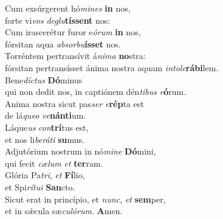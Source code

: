 \evenverse Cum exsúrgerent hó\textit{mi}\textit{nes} \textbf{in} nos,~\*\\
\evenverse forte vi\textit{vos} \textit{de}\textit{glu}\textbf{tís}\textbf{sent} nos:\\
\oddverse Cum irascerétur furor e\textit{ó}\textit{rum} \textbf{in} nos,~\*\\
\oddverse fórsitan aqua \textit{ab}\textit{sor}\textit{bu}\textbf{ís}\textbf{set} nos.\\
\evenverse Torréntem pertransívit á\textit{ni}\textit{ma} \textbf{no}stra:~\*\\
\evenverse fórsitan pertransísset ánima nostra aquam \textit{in}\textit{to}\textit{le}\textbf{rá}\textbf{bi}lem.\\
\oddverse Bene\textit{dí}\textit{ctus} \textbf{Dó}minus~\*\\
\oddverse qui non dedit nos, in captiónem dén\textit{ti}\textit{bus} \textit{e}\textbf{ó}rum.\\
\evenverse Anima nostra sicut pas\textit{ser} \textit{e}\textbf{rép}ta est~\*\\
\evenverse de lá\textit{que}\textit{o} \textit{ve}\textbf{nán}\textbf{ti}um.\\
\oddverse Láque\textit{us} \textit{con}\textbf{trí}tus est,~\*\\
\oddverse et nos li\textit{be}\textit{rá}\textit{ti} \textbf{su}mus.\\
\evenverse Adjutórium nostrum in nó\textit{mi}\textit{ne} \textbf{Dó}mini,~\*\\
\evenverse qui fecit \textit{cæ}\textit{lum} \textit{et} \textbf{ter}ram.\\
\oddverse Glória Pa\textit{tri}, \textit{et} \textbf{Fí}lio,~\*\\
\oddverse et Spi\textit{rí}\textit{tu}\textit{i} \textbf{San}cto.\\
\evenverse Sicut erat in princípio, et \textit{nunc}, \textit{et} \textbf{sem}per,~\*\\
\evenverse et in sǽcula sæ\textit{cu}\textit{ló}\textit{rum}. \textbf{A}men.\\
